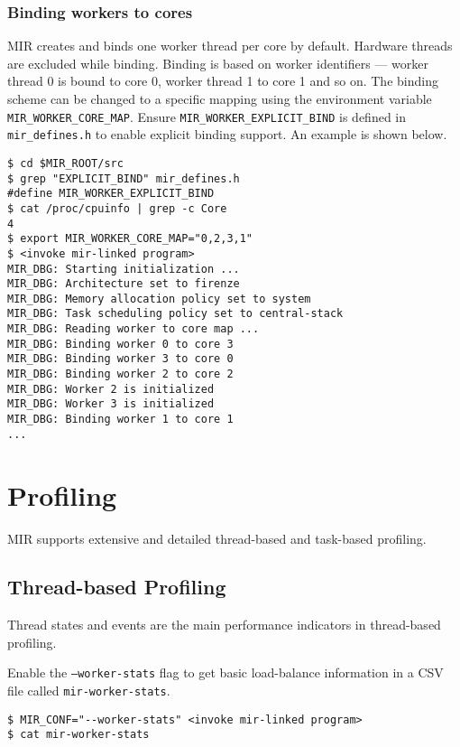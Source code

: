 \documentclass[11pt,a4paper]{article}
\begin{document}
\subsubsection{Binding workers to cores}\label{binding-workers-to-cores}

MIR creates and binds one worker thread per core by default. Hardware threads are excluded while binding. Binding is based on worker identifiers --- worker thread 0 is bound to core 0, worker thread 1 to core 1 and so on. The binding scheme can be changed to a specific mapping using the environment variable \texttt{MIR\_WORKER\_CORE\_MAP}. Ensure \texttt{MIR\_WORKER\_EXPLICIT\_BIND} is defined in \texttt{mir\_defines.h} to enable explicit binding support. An example is shown below.

\begin{lstlisting}[style=MyInputStyle]
$ cd $MIR_ROOT/src
$ grep "EXPLICIT_BIND" mir_defines.h
#define MIR_WORKER_EXPLICIT_BIND
$ cat /proc/cpuinfo | grep -c Core
4
$ export MIR_WORKER_CORE_MAP="0,2,3,1"
$ <invoke mir-linked program>
MIR_DBG: Starting initialization ...
MIR_DBG: Architecture set to firenze
MIR_DBG: Memory allocation policy set to system
MIR_DBG: Task scheduling policy set to central-stack
MIR_DBG: Reading worker to core map ...
MIR_DBG: Binding worker 0 to core 3
MIR_DBG: Binding worker 3 to core 0
MIR_DBG: Binding worker 2 to core 2
MIR_DBG: Worker 2 is initialized
MIR_DBG: Worker 3 is initialized
MIR_DBG: Binding worker 1 to core 1
...
\end{lstlisting}

\section{Profiling}\label{profiling}

MIR supports extensive and detailed thread-based and task-based profiling.

\subsection{Thread-based Profiling}\label{thread-based-profiling}

Thread states and events are the main performance indicators in thread-based profiling.

Enable the \texttt{--worker-stats} flag to get basic load-balance information in a CSV file called \texttt{mir-worker-stats}.

\begin{lstlisting}[style=MyInputStyle]
$ MIR_CONF="--worker-stats" <invoke mir-linked program>
$ cat mir-worker-stats
\end{lstlisting}
\end{document}
